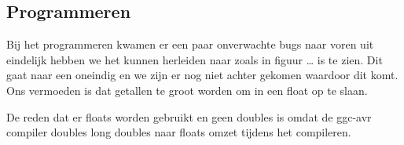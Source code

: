 \subsection{Programmeren}
Bij het programmeren kwamen er een paar onverwachte bugs naar voren uit eindelijk hebben we het kunnen herleiden naar zoals in figuur \dots
is te zien. %
Dit gaat naar een oneindig en we zijn er nog niet achter gekomen waardoor dit komt. Ons vermoeden is dat getallen te groot worden om in 
een float op te slaan. 

\noindent
De reden dat er floats worden gebruikt en geen doubles is omdat de ggc-avr compiler doubles long doubles naar floats omzet tijdens het 
compileren.



